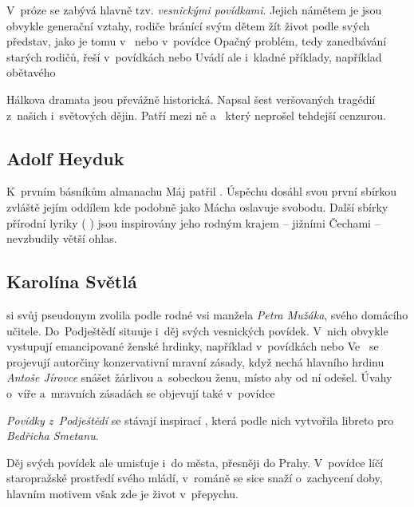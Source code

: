 V~próze se zabývá hlavně tzv. \emph{vesnickými povídkami}. Jejich
námětem je jsou obvykle generační vztahy, rodiče bránící svým dětem žít
život podle svých představ, jako je tomu v~
nebo v~povídce  Opačný problém, tedy
zanedbávání starých rodičů, řeší v~povídkách  nebo 
 Uvádí ale i~kladné příklady, například obětavého

Hálkova dramata jsou převážně historická. Napsal šest veršovaných
tragédií z~našich i~světových dějin. Patří mezi ně 
 a~ který neprošel
tehdejší cenzurou.

\subsection*{Adolf Heyduk}
K~prvním básníkům almanachu Máj patřil . Úspěchu
dosáhl svou první sbírkou  zvláště jejím oddílem
 kde podobně jako Mácha oslavuje svobodu. Další
sbírky přírodní lyriky ( ) jsou
inspirovány jeho rodným krajem -- jižními Čechami -- nevzbudily větší
ohlas.

\subsection*{Karolína Světlá}
 si svůj pseudonym zvolila podle rodné vsi
manžela \emph{Petra Mužáka}, svého domácího učitele. Do~Podještědí
situuje i~děj svých vesnických povídek. V~nich obvykle vystupují
emancipované ženské hrdinky, například v~povídkách 
 nebo  Ve~ se
projevují autorčiny konzervativní mravní zásady, když nechá hlavního
hrdinu \emph{Antoše Jírovce} snášet žárlivou a~sobeckou ženu, místo aby
od ní odešel. Úvahy o~víře a~mravních zásadách se objevují také
v~povídce 

\emph{Povídky z~Podještědí} se stávají inspirací , která podle nich vytvořila
 libreto pro \emph{Bedřicha Smetanu}.

Děj svých povídek ale umisťuje i~do města, přesněji do Prahy. V~povídce
 líčí staropražské prostředí svého mládí, v~románě
 se sice snaží o~zachycení doby, hlavním
motivem však zde je život v~přepychu.

